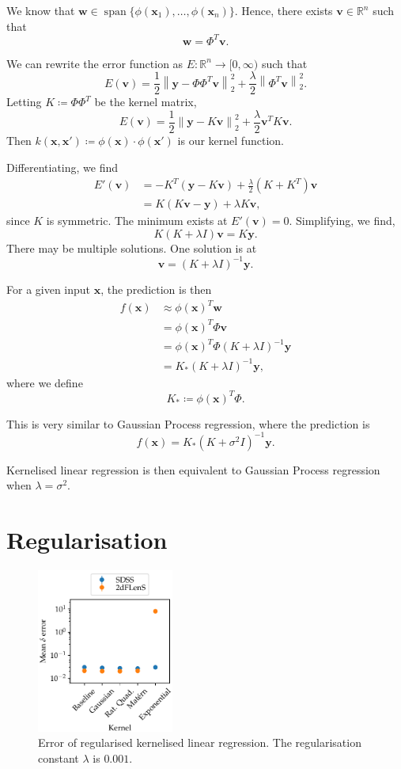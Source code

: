 \documentclass[11pt,twoside]{report}
\newcommand\bbR{\mathbb{R}}
\newcommand\bv{\mathbf{v}}
\newcommand\bw{\mathbf{w}}
\newcommand\bx{\mathbf{x}}
\newcommand\by{\mathbf{y}}
\newcommand\norm[1]{\left\|#1\right\|}
\DeclareMathOperator{\spn}{span}
\begin{document}
We know that $\bw \in \spn\{\phi(\bx_1), \dots, \phi(\bx_n)\}$. Hence, there exists $\bv \in \bbR^n$ such that \[
    \bw = \Phi^T\bv \text{.}
\]

We can rewrite the error function as $E : \bbR^n \to [0, \infty)$ such that \[
    E(\bv) = \frac{1}{2}\norm{\by - \Phi\Phi^T\bv}_2^2 + \frac{\lambda}{2} \norm{\Phi^T\bv}_2^2 \text{.}
\] Letting $K \coloneqq \Phi\Phi^T$ be the kernel matrix,\[
    E(\bv) = \frac{1}{2}\norm{\by - K\bv}_2^2 + \frac{\lambda}{2} \bv^T K \bv \text{.}
\] Then $k(\bx, \bx') \coloneqq \phi(\bx) \cdot \phi(\bx')$ is our kernel function.

Differentiating, we find \begin{align*}
    E'(\bv) &= -K^T(\by - K\bv) + \frac{\lambda}{2} (K + K^T)\bv \\
    &= K(K\bv - \by) + \lambda K\bv \text{,}
\end{align*} since $K$ is symmetric. The minimum exists at $E'(\bv) = 0$. Simplifying, we find,\[
    K(K + \lambda I)\bv = K\by \text{.}
\] There may be multiple solutions. One solution is at \[
    \bv = (K + \lambda I)^{-1}\by \text{.}
\]

For a given input $\bx$, the prediction is then \begin{align*}
    f(\bx) &\approx \phi(\bx)^T \bw \\
    &= \phi(\bx)^T \Phi \bv \\
    &= \phi(\bx)^T \Phi (K + \lambda I)^{-1}\by \\
    &= K_* (K + \lambda I)^{-1}\by \text{,}
\end{align*} where we define \[
    K_* \coloneqq \phi(\bx)^T \Phi \text{.}
\]

This is very similar to Gaussian Process regression, where the prediction is \[
    f(\bx) = K_*\left(K + \sigma^2 I\right)^{-1}\by \text{.}
\]

Kernelised linear regression is then equivalent to Gaussian Process regression when $\lambda = \sigma^2$.

\section{Regularisation}

  \begin{figure}
    \centering
    \includegraphics[width=0.4\textwidth]{linreg_kernelised_regularised.pdf}
    \caption{Error of regularised kernelised linear regression. The regularisation constant $\lambda$ is $0.001$.}
    \label{fig:linreg_kernelised_regularised}
  \end{figure}
\end{document}
